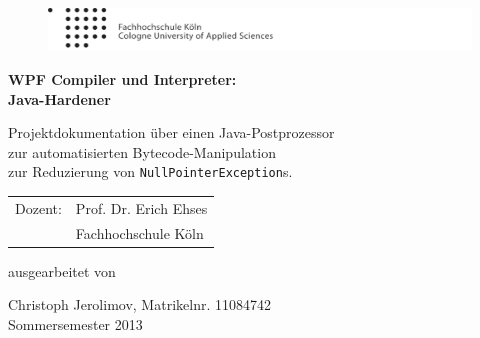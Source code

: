 
\begin{titlepage}

\begin{center}

\begin{figure}[!ht]
	\centering
		\includegraphics[natwidth=920pt, natheight=95pt, width=1.0\textwidth]{tex/logoheader.pdf}
\end{figure}

\vspace{5.0cm}

\begin{Huge}
	\textbf{WPF Compiler und Interpreter:}\\
	\vspace{0.1cm}
	\textbf{Java-Hardener}\\
\end{Huge}

\vspace{0.8cm}

\begin{LARGE}
	Projektdokumentation über einen Java-Postprozessor\\
	\vspace{0.1cm}
	zur automatisierten Bytecode-Manipulation\\
	\vspace{0.1cm}
	zur Reduzierung von \texttt{NullPointerException}s.\\
\end{LARGE}

\vspace{4.5cm}

\begin{tabular}{rl}
        Dozent:  &  Prof. Dr. Erich Ehses\\
       			 &  \small Fachhochschule Köln \\[1.0em]
\end{tabular}

\vspace{2.0cm}

\begin{large}
	ausgearbeitet von\\
	\vspace{0.2cm}
\end{large}

\begin{Large}
	Christoph Jerolimov, Matrikelnr. 11084742\\
	\vspace{0.5cm}
	Sommersemester 2013
\end{Large}

\end{center}

\end{titlepage}
